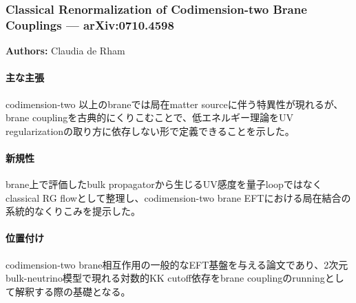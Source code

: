 \subsubsection{Classical Renormalization of Codimension-two Brane Couplings --- arXiv:0710.4598}

\textbf{Authors:} Claudia de Rham

\paragraph{主な主張}
codimension-two 以上のbraneでは局在matter sourceに伴う特異性が現れるが、brane couplingを古典的にくりこむことで、低エネルギー理論をUV regularizationの取り方に依存しない形で定義できることを示した\cite{DeRham:2007ClassicalBrane}。

\paragraph{新規性}
brane上で評価したbulk propagatorから生じるUV感度を量子loopではなくclassical RG flowとして整理し、codimension-two brane EFTにおける局在結合の系統的なくりこみを提示した。

\paragraph{位置付け}
codimension-two brane相互作用の一般的なEFT基盤を与える論文であり、2次元bulk-neutrino模型で現れる対数的KK cutoff依存をbrane couplingのrunningとして解釈する際の基礎となる。

